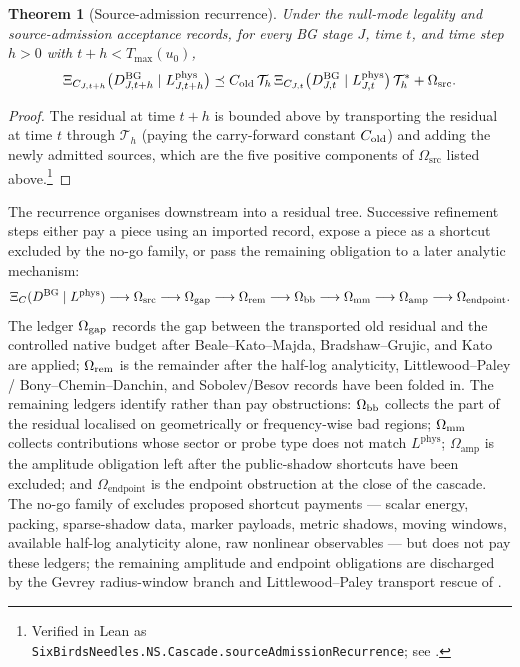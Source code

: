\documentclass[11pt]{article}
\newcommand{\preceqq}{\preceq}
\newcommand{\DBG}{D^{\mathrm{BG}}}
\newcommand{\Lphys}{L^{\mathrm{phys}}}
\newcommand{\Tmax}{T_{\max}}
\newcommand{\Omsrc}{\Omega_{\mathrm{src}}}
\newcommand{\Omamp}{\Omega_{\mathrm{amp}}}
\newcommand{\Omend}{\Omega_{\mathrm{endpoint}}}
\newtheorem{theorem}{Theorem}[section]
\theoremstyle{definition}
\begin{document}
\begin{theorem}[Source-admission recurrence]\label{thm:ns:source-admission-recurrence}
Under the null-mode legality and source-admission acceptance records,
for every BG stage \(J\), time \(t\), and time step \(h>0\) with
\(t+h<\Tmax(u_0)\),
\[
  \Xi_{C_{J,t+h}}\bigl(\DBG_{J,t+h}\mid \Lphys_{J,t+h}\bigr)
  \preceqq
  C_{\rm old}\,
  \mathcal T_h\,
  \Xi_{C_{J,t}}\bigl(\DBG_{J,t}\mid \Lphys_{J,t}\bigr)\,
  \mathcal T_h^*
  + \Omsrc .
\]
\end{theorem}

\begin{proof}
The residual at time \(t+h\) is bounded above by transporting the
residual at time \(t\) through \(\mathcal T_h\) (paying the
carry-forward constant \(C_{\rm old}\)) and adding the newly admitted
sources, which are the five positive components of \(\Omsrc\) listed
above.\footnote{Verified in Lean as \texttt{SixBirdsNeedles.NS.Cascade.sourceAdmissionRecurrence}; see .}
\end{proof}

The recurrence organises downstream into a residual tree.  Successive
refinement steps either pay a piece using an imported record, expose
a piece as a shortcut excluded by the no-go family, or pass the
remaining obligation to a later analytic mechanism:
\[
  \Xi_C(\DBG\mid\Lphys)
  \longrightarrow
  \Omsrc
  \longrightarrow
  \Omega_{\rm gap}
  \longrightarrow
  \Omega_{\rm rem}
  \longrightarrow
  \Omega_{\rm bb}
  \longrightarrow
  \Omega_{\rm mm}
  \longrightarrow
  \Omamp
  \longrightarrow
  \Omend .
\]
The ledger \(\Omega_{\rm gap}\) records the gap between the
transported old residual and the controlled native budget after
Beale--Kato--Majda, Bradshaw--Grujic, and Kato are applied;
\(\Omega_{\rm rem}\) is the remainder after the half-log analyticity,
Littlewood--Paley / Bony--Chemin--Danchin, and Sobolev/Besov records
have been folded in.  The remaining ledgers identify rather than pay
obstructions: \(\Omega_{\rm bb}\) collects the part of the residual
localised on geometrically or frequency-wise bad regions;
\(\Omega_{\rm mm}\) collects contributions whose sector or probe type
does not match \(\Lphys\); \(\Omamp\) is the amplitude obligation left
after the public-shadow shortcuts have been excluded; and \(\Omend\)
is the endpoint obstruction at the close of the cascade.  The no-go
family of  excludes proposed shortcut payments ---
scalar energy, packing, sparse-shadow data, marker payloads, metric
shadows, moving windows, available half-log analyticity alone, raw
nonlinear observables --- but does not pay these ledgers; the
remaining amplitude and endpoint obligations are discharged by the
Gevrey radius-window branch and Littlewood--Paley transport rescue of
.
\end{document}
